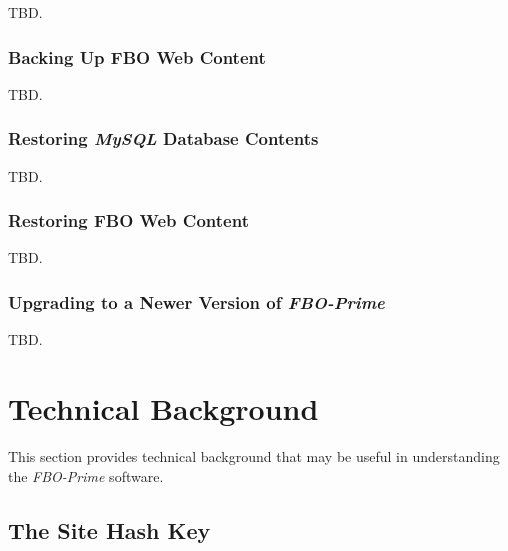 \documentclass[letterpaper,10pt,titlepage]{article}
\newcommand{\productbasename}{FBO-Prime}
\begin{document}
TBD.


\subsubsection{Backing Up FBO Web Content}
\label{sins0:smpr0:sbak1}

TBD.


\subsubsection{Restoring \emph{MySQL} Database Contents}
\label{sins0:smpr0:sres0}

TBD.


\subsubsection{Restoring FBO Web Content}
\label{sins0:smpr0:sres1}

TBD.


\subsubsection{Upgrading to a Newer Version of \emph{\productbasename{}}}
\label{sins0:smpr0:sugd0}

TBD.


\section{Technical Background}
\label{stbg0}

This section provides technical background that may be useful in understanding
the \emph{\productbasename{}} software.



\subsection{The Site Hash Key}
\label{stbg0:sshk0}
\end{document}
